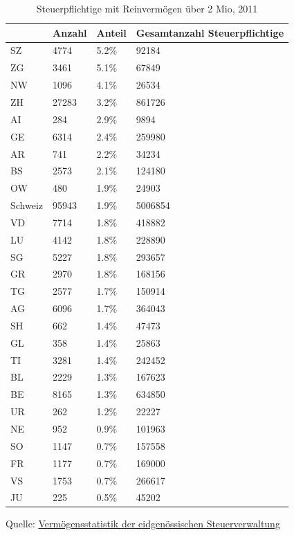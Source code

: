 \documentclass[a4paper, 12pt,liststotoc]{scrartcl}
\numberwithin{equation}{section}
\begin{document}
\begin{table}
\centering
\footnotesize
\caption{Steuerpflichtige mit Reinvermögen über 2 Mio, 2011}
\begin{tabular}{L{2.2cm}L{2.5cm}L{2.5cm}L{3cm}}
\toprule
~ & Anzahl & Anteil & Gesamtanzahl Steuerpflichtige\\
\midrule
SZ & 4774 & 5.2\% & 92184\\
ZG & 3461 & 5.1\% & 67849\\
NW & 1096 & 4.1\% & 26534\\
ZH & 27283 & 3.2\% & 861726\\
AI & 284 & 2.9\% & 9894\\
GE & 6314 & 2.4\% & 259980\\
AR & 741 & 2.2\% & 34234\\
BS & 2573 & 2.1\% & 124180\\
OW & 480 & 1.9\% & 24903\\
\midrule
Schweiz & 95943 & 1.9\% &
5006854\\
\midrule
VD & 7714 & 1.8\% & 418882\\
LU & 4142 & 1.8\% & 228890\\
SG & 5227 & 1.8\% & 293657\\
GR & 2970 & 1.8\% & 168156\\
TG & 2577 & 1.7\% & 150914\\
AG & 6096 & 1.7\% & 364043\\
SH & 662 & 1.4\% & 47473\\
GL & 358 & 1.4\% & 25863\\
TI & 3281 & 1.4\% & 242452\\
BL & 2229 & 1.3\% & 167623\\
\midrule
BE & 8165 & 1.3\% &
634850\\
\midrule
UR & 262 & 1.2\% & 22227\\
NE & 952 & 0.9\% & 101963\\
SO & 1147 & 0.7\% & 157558\\
FR & 1177 & 0.7\% & 169000\\
VS & 1753 & 0.7\% & 266617\\
JU & 225 & 0.5\% & 45202\\
\bottomrule
\end{tabular}
\begin{tablenotes}
\small
\item Quelle: \href{http://www.estv.admin.ch/dokumentation/00075/00076/00717/?lang=de}{Vermögensstatistik der eidgenössischen Steuerverwaltung}
\end{tablenotes}
\label{tab:steuerpflichtige}
\end{table}

\newpage
\printbibliography[heading=bibintoc]
\end{document}
